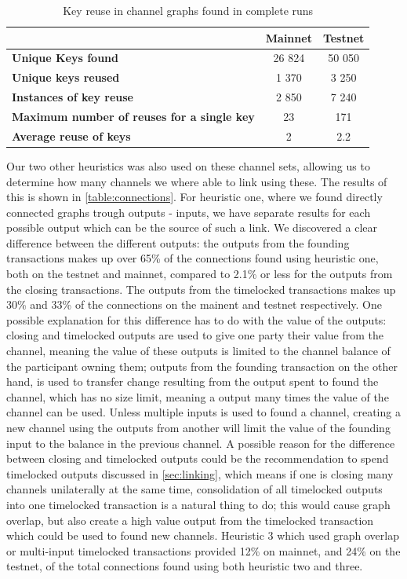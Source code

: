 \begin{table}[ht]
\centering
\caption{Key reuse in channel graphs found in complete runs}
\label{key_reuse_table}
\begin{tabular}{l|c|c}
                                                    & \textbf{Mainnet} & \textbf{Testnet} \\ \hline
\textbf{Unique Keys found}                         & 26 824              & 50 050 \\ \hline
\textbf{Unique keys reused}                        & 1 370               & 3 250 \\ \hline
\textbf{Instances of key reuse}                    & 2 850               & 7 240 \\ \hline
\textbf{Maximum number of reuses for a single key} & 23               & 171 \\ \hline
\textbf{Average reuse of keys}                     & 2                & 2.2  \\ \hline
\end{tabular}
\end{table}

Our two other heuristics was also used on these channel sets, allowing us to determine how many channels we where able to link using these. The results of this is shown in \cref{table:connections}. For heuristic one, where we found directly connected graphs trough outputs - inputs, we have separate results for each possible output which can be the source of such a link. We discovered a clear difference between the different outputs: the outputs from the founding transactions makes up over 65\% of the connections found using heuristic one, both on the testnet and mainnet, compared to 2.1\% or less for the outputs from the closing transactions. The outputs from the timelocked transactions makes up 30\% and 33\% of the connections on the mainent and testnet respectively. One possible explanation for this difference has to do with the value of the outputs: closing and timelocked outputs are used to give one party their value from the channel, meaning the value of these outputs is limited to the channel balance of the participant owning them; outputs from the founding transaction on the other hand, is used to transfer change resulting from the output spent to found the channel, which has no size limit, meaning a output many times the value of the channel can be used. Unless multiple inputs is used to found a channel, creating a new channel using the outputs from another will limit the value of the founding input to the balance in the previous channel. A possible reason for the difference between closing and timelocked outputs could be the recommendation to spend timelocked outputs discussed in \cref{sec:linking}, which means if one is closing many channels unilaterally at the same time, consolidation of all timelocked outputs into one timelocked transaction is a natural thing to do; this would cause graph overlap, but also create a high value output from the timelocked transaction which could be used to found new channels. Heuristic 3 which used graph overlap or multi-input timelocked transactions provided 12\% on mainnet, and 24\% on the testnet, of the total connections found using both heuristic two and three.

